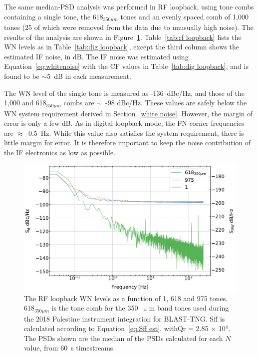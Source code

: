 The same median-PSD analysis was performed in RF loopback, using tone combs containing a single tone, the 618$_{350\mu m}$ tones and an evenly spaced comb of 1,000 tones (25 of which were removed from the data due to unusually high noise). The results of the analysis are shown in Figure~\ref{fig:rf loopback noise}. Table~\ref{tab:rf loopback} lists the WN levels as in Table~\ref{tab:dig loopback}, except the third column shows the estimated IF noise, in dB. The IF noise was estimated using Equation~\ref{eq:whitenoise} with the CF values in Table~\ref{tab:dig loopback}, and is found to be $\sim$5~dB in each measurement.

The WN level of the single tone is measured as -136~dBc/Hz, and those of the 1,000 and 618$_{350\mu m}$ combs are $\sim$~-98 dBc/Hz. These values are safely below the WN system requirement derived in Section~\ref{white noise}. However, the margin of error is only a few dB. As in digital loopback mode, the FN corner frequencies are $\approx$~0.5~Hz. While this value also satisfies the system requirement, there is little margin for error. It is therefore important to keep the noise contribution of the IF electronics as low as possible.

\begin{figure}[!htbp]
\centering
\includegraphics[width=\textwidth]{figures/readout/sim/IF_LB_noise}
\caption[~The RF loopback WN levels as a function of 1, 618 and 975 tones.]{The RF loopback WN levels as a function of 1, 618 and 975 tones. 618$_{350\mu m}$ is the tone comb for the 350~$\upmu$m band tones used during the 2018 Palestine instrument integration for BLAST-TNG\@. \gls{Sff} is calculated according to Equation~\ref{eq:Sff est}, with\gls{Qr} = 2.85 $\times$ 10$^{4}$. The PSDs shown are the median of the PSDs calculated for each $N$ value, from 60~s timestreams.}
\label{fig:rf loopback noise}
\end{figure}


